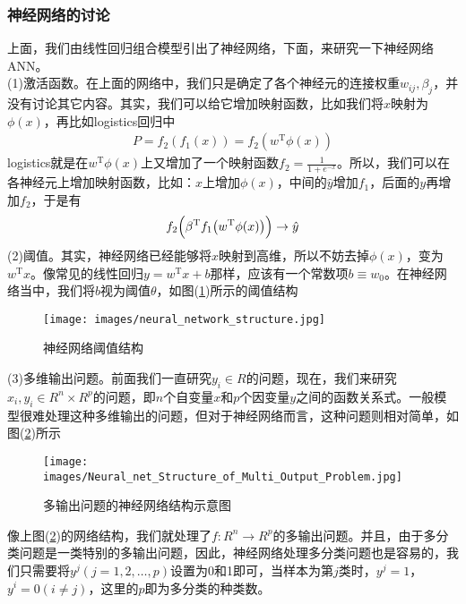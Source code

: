        \subsubsection{神经网络的讨论}
            \par
            上面，我们由线性回归组合模型引出了神经网络，下面，来研究一下神经网络ANN。\\
            (1)激活函数。在上面的网络中，我们只是确定了各个神经元的连接权重$w_{ij},\beta_j$，并没有讨论其它内容。其实，我们可以给它增加映射函数，比如我们将$x$映射为$\phi(x)$，再比如logistics回归中
            \begin{align*}
            P = f_2(f_1(x)) = f_2(w^\mathrm{T}\phi(x))
            \end{align*}
            logistics就是在$w^\mathrm{T}\phi(x)$上又增加了一个映射函数$f_2 = \frac{1}{1+e^{-x}}$。所以，我们可以在各神经元上增加映射函数，比如：$x$上增加$\phi(x)$，中间的$\hat{y}$增加$f_1$，后面的$y$再增加$f_2$，于是有
            \begin{align*}
            f_2\Bigl(\beta^\mathrm{T}f_1\big(w^\mathrm{T}\phi(x)\big)\Bigr) \rightarrow \hat{y}
            \end{align*}
            (2)阈值。其实，神经网络已经能够将$x$映射到高维，所以不妨去掉$\phi(x)$，变为$w^\mathrm{T}x$。像常见的线性回归$y=w^\mathrm{T}x + b$那样，应该有一个常数项$b \equiv w_0$。在神经网络当中，我们将$b$视为阈值$\theta$，如图(\ref{fig:神经网络阈值结构})所示的阈值结构
            \begin{figure}[H]
            \centering
            \texttt{[image: images/neural\_network\_structure.jpg]}
            \caption{神经网络阈值结构}
            \label{fig:神经网络阈值结构}
            \end{figure}
            \noindent (3)多维输出问题。前面我们一直研究$y_i\in R$的问题，现在，我们来研究$x_i,y_i\in R^n\times R^p$的问题，即$n$个自变量$x$和$p$个因变量$y$之间的函数关系式。一般模型很难处理这种多维输出的问题，但对于神经网络而言，这种问题则相对简单，如图(\ref{fig:多输出问题的神经网络结构示意图})所示
            \begin{figure}[H]
            \centering
            \texttt{[image: images/Neural\_net\_Structure\_of\_Multi\_Output\_Problem.jpg]}
            \caption{多输出问题的神经网络结构示意图}
            \label{fig:多输出问题的神经网络结构示意图}
            \end{figure}
           像上图(\ref{fig:多输出问题的神经网络结构示意图})的网络结构，我们就处理了$f:R^n\rightarrow R^p$的多输出问题。并且，由于多分类问题是一类特别的多输出问题，因此，神经网络处理多分类问题也是容易的，我们只需要将$y^j(j=1,2,\dots,p)$设置为0和1即可，当样本为第$j$类时，$y^j = 1$，$y^i=0(i\neq j)$，这里的$p$即为多分类的种类数。\\
